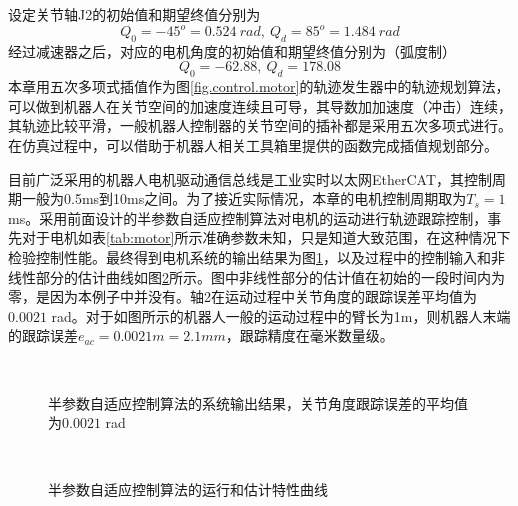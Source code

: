设定关节轴J2的初始值和期望终值分别为
$$Q_{0}=-45^{o}=0.524\ rad,\ Q_{d}=85^{o}=1.484\ rad$$
经过减速器之后，对应的电机角度的初始值和期望终值分别为（弧度制）
$$Q_{0}=-62.88,\ Q_{d}=178.08$$
本章用五次多项式插值作为图\ref{fig.control.motor}的轨迹发生器中的轨迹规划算法，可以做到机器人在关节空间的加速度连续且可导，其导数加加速度（冲击）连续，其轨迹比较平滑，一般机器人控制器的关节空间的插补都是采用五次多项式进行。在仿真过程中，可以借助于机器人相关工具箱里提供的函数完成插值规划部分。

目前广泛采用的机器人电机驱动通信总线是工业实时以太网EtherCAT，其控制周期一般为0.5ms到10ms之间。为了接近实际情况，本章的电机控制周期取为$T_{s}=1$ms。采用前面设计的半参数自适应控制算法对电机的运动进行轨迹跟踪控制，事先对于电机如表\ref{tab:motor}所示准确参数未知，只是知道大致范围，在这种情况下检验控制性能。最终得到电机系统的输出结果为图\ref{fig.sim.semi.yye}，以及过程中的控制输入和非线性部分的估计曲线如图\ref{fig.sim.semi.a}所示。图中非线性部分的估计值在初始的一段时间内为零，是因为本例子中并没有。轴2在运动过程中关节角度的跟踪误差平均值为$0.0021$ rad。对于如图所示的机器人一般的运动过程中的臂长为1m，则机器人末端的跟踪误差$e_{ac}=0.0021m=2.1mm$，跟踪精度在毫米数量级。

\begin{figure}[!htb]
	\centering
	\\
	\caption{半参数自适应控制算法的系统输出结果，关节角度跟踪误差的平均值为$0.0021$ rad}
	\label{fig.sim.semi.yye}
\end{figure}

\begin{figure}[!htb]
	\centering
	\\
	\caption{半参数自适应控制算法的运行和估计特性曲线}
	\label{fig.sim.semi.a}
\end{figure}

